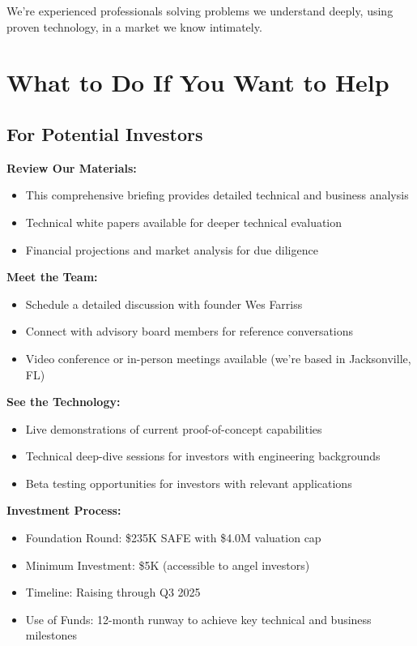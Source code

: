 \documentclass[11pt,letterpaper]{article}
\begin{document}
We're experienced professionals solving problems we understand deeply, using proven technology, in a market we know intimately.

\section*{What to Do If You Want to Help}

\subsection*{For Potential Investors}

\textbf{Review Our Materials:}
\begin{itemize}[leftmargin=10pt, itemsep=1pt]
    \item This comprehensive briefing provides detailed technical and business analysis
    \item Technical white papers available for deeper technical evaluation
    \item Financial projections and market analysis for due diligence
\end{itemize}

\textbf{Meet the Team:}
\begin{itemize}[leftmargin=10pt, itemsep=1pt]
    \item Schedule a detailed discussion with founder Wes Farriss
    \item Connect with advisory board members for reference conversations
    \item Video conference or in-person meetings available (we're based in Jacksonville, FL)
\end{itemize}

\textbf{See the Technology:}
\begin{itemize}[leftmargin=10pt, itemsep=1pt]
    \item Live demonstrations of current proof-of-concept capabilities
    \item Technical deep-dive sessions for investors with engineering backgrounds
    \item Beta testing opportunities for investors with relevant applications
\end{itemize}

\textbf{Investment Process:}
\begin{itemize}[leftmargin=10pt, itemsep=1pt]
    \item Foundation Round: \$235K SAFE with \$4.0M valuation cap
    \item Minimum Investment: \$5K (accessible to angel investors)
    \item Timeline: Raising through Q3 2025
    \item Use of Funds: 12-month runway to achieve key technical and business milestones
\end{itemize}
\end{document}
